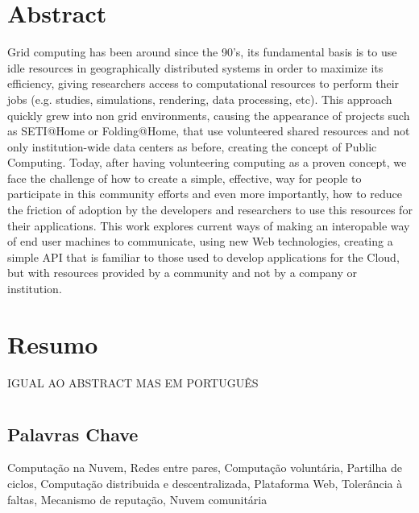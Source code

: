 \chapter*{Abstract}
\thispagestyle{empty}

Grid computing has been around since the 90's, its fundamental basis is to use idle resources in geographically distributed systems in order to maximize its efficiency, giving researchers access to computational resources to perform their jobs (e.g. studies, simulations, rendering, data processing, etc). This approach quickly grew into non grid environments, causing the appearance of projects such as SETI@Home or Folding@Home, that use volunteered shared resources and not only institution-wide data centers as before, creating the concept of Public Computing. Today, after having volunteering computing as a proven concept, we face the challenge of how to create a simple, effective, way for people to participate in this community efforts and even more importantly, how to reduce the friction of adoption by the developers and researchers to use this resources for their applications. This work explores current ways of making an interopable way of end user machines to communicate, using new Web technologies, creating a simple API that is familiar to those used to develop applications for the Cloud, but with resources provided by a community and not by a company or institution.


\newpage
\chapter*{Resumo}
\thispagestyle{empty}

IGUAL AO ABSTRACT MAS EM PORTUGUÊS



\newpage
\chapter*{}
\thispagestyle{empty}

\section*{Palavras Chave}
{\large
    \noindent Computa\c{c}\~ao na Nuvem,
    \noindent Redes entre pares,
    \noindent Computação voluntária,
    \noindent Partilha de ciclos,
    \noindent Computa\c{c}\~ao distribuida e descentralizada,
    \noindent Plataforma Web,
    \noindent Tolerância à faltas,
    \noindent Mecanismo de reputação,
    \noindent Nuvem comunitária
}

